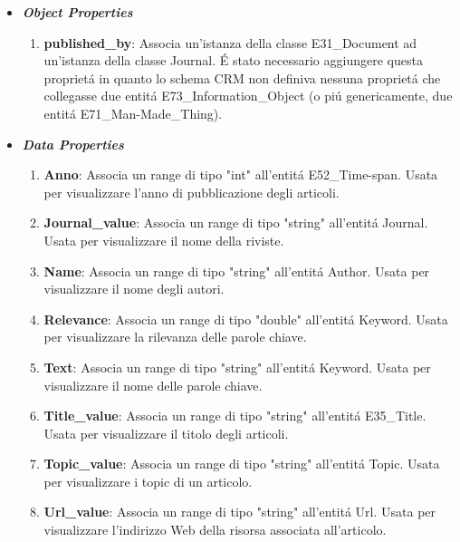 \documentclass[11pt,a4paper]{article}
\begin{document}
\begin{itemize}
		\item \textbf{\textit{Object Properties}}
		
		
		\begin{enumerate}
			\item \textbf{published\_by}: Associa un'istanza della classe E31\_Document ad un'istanza della classe Journal. \'E stato necessario aggiungere questa propriet\'a in quanto lo schema CRM non definiva nessuna propriet\'a che collegasse due entit\'a E73\_Information\_Object (o pi\'u genericamente, due entit\'a E71\_Man-Made\_Thing).
			
		\end{enumerate}
		
		\item \textbf{\textit{Data Properties}}
		
			\begin{enumerate}
				\item \textbf{Anno}: Associa un range di tipo "int" all'entit\'a E52\_Time-span. Usata per visualizzare l'anno di pubblicazione degli articoli.
				
				\item \textbf{Journal\_value}: Associa un range di tipo "string" all'entit\'a Journal. Usata per visualizzare il nome della riviste.
				
				\item \textbf{Name}: Associa un range di tipo "string" all'entit\'a Author. Usata per visualizzare il nome degli autori.
				
				\item \textbf{Relevance}: Associa un range di tipo "double" all'entit\'a Keyword. Usata per visualizzare la rilevanza delle parole chiave.
				
				\item \textbf{Text}: Associa un range di tipo "string" all'entit\'a Keyword. Usata per visualizzare il nome delle parole chiave.
				
				\item \textbf{Title\_value}: Associa un range di tipo "string" all'entit\'a E35\_Title. Usata per visualizzare il titolo degli articoli.
				
				\item \textbf{Topic\_value}: Associa un range di tipo "string" all'entit\'a Topic. Usata per visualizzare i topic di un articolo.
				
				\item \textbf{Url\_value}: Associa un range di tipo "string" all'entit\'a Url. Usata per visualizzare l'indirizzo Web della risorsa associata all'articolo.
				
					
			\end{enumerate}
		
\end{itemize}
\end{document}
